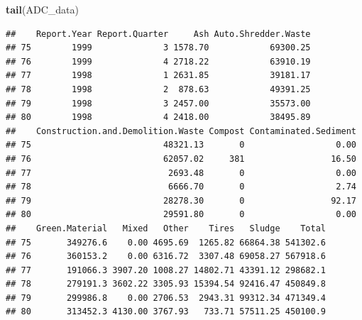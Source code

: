 \documentclass[12pt,]{article}
\newenvironment{Shaded}{\begin{snugshade}}{\end{snugshade}}
\newcommand{\KeywordTok}[1]{\textcolor[rgb]{0.13,0.29,0.53}{\textbf{#1}}}
\newcommand{\NormalTok}[1]{#1}
\begin{document}
\begin{Shaded}
\begin{Highlighting}[]
\KeywordTok{tail}\NormalTok{(ADC_data)}
\end{Highlighting}
\end{Shaded}

\begin{verbatim}
##    Report.Year Report.Quarter     Ash Auto.Shredder.Waste
## 75        1999              3 1578.70            69300.25
## 76        1999              4 2718.22            63910.19
## 77        1998              1 2631.85            39181.17
## 78        1998              2  878.63            49391.25
## 79        1998              3 2457.00            35573.00
## 80        1998              4 2418.00            38495.89
##    Construction.and.Demolition.Waste Compost Contaminated.Sediment
## 75                          48321.13       0                  0.00
## 76                          62057.02     381                 16.50
## 77                           2693.48       0                  0.00
## 78                           6666.70       0                  2.74
## 79                          28278.30       0                 92.17
## 80                          29591.80       0                  0.00
##    Green.Material   Mixed   Other    Tires   Sludge    Total
## 75       349276.6    0.00 4695.69  1265.82 66864.38 541302.6
## 76       360153.2    0.00 6316.72  3307.48 69058.27 567918.6
## 77       191066.3 3907.20 1008.27 14802.71 43391.12 298682.1
## 78       279191.3 3602.22 3305.93 15394.54 92416.47 450849.8
## 79       299986.8    0.00 2706.53  2943.31 99312.34 471349.4
## 80       313452.3 4130.00 3767.93   733.71 57511.25 450100.9
\end{verbatim}
\end{document}
